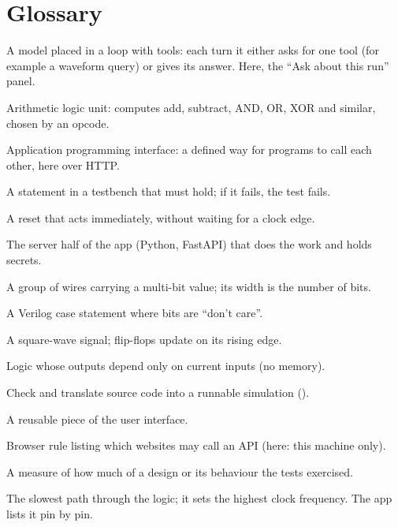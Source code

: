 
\chapter{Glossary}
\label{app:glossary}

\begin{description}[style=nextline,itemsep=1pt]
  \item[Agent (debugging)] A model placed in a loop with tools: each turn it either asks for one tool (for example a waveform query) or gives its answer. Here, the ``Ask about this run'' panel.
  \item[ALU] Arithmetic logic unit: computes add, subtract, AND, OR, XOR and similar, chosen by an opcode.
  \item[API] Application programming interface: a defined way for programs to call each other, here over HTTP.
  \item[Assertion] A statement in a testbench that must hold; if it fails, the test fails.
  \item[Asynchronous reset] A reset that acts immediately, without waiting for a clock edge.
  \item[Backend] The server half of the app (Python, FastAPI) that does the work and holds secrets.
  \item[Bus] A group of wires carrying a multi-bit value; its width is the number of bits.
  \item[casez] A Verilog case statement where  bits are ``don't care''.
  \item[Clock] A square-wave signal; flip-flops update on its rising edge.
  \item[Combinational logic] Logic whose outputs depend only on current inputs (no memory).
  \item[Compile (Verilog)] Check and translate source code into a runnable simulation ().
  \item[Component (React)] A reusable piece of the user interface.
  \item[CORS] Browser rule listing which websites may call an API (here: this machine only).
  \item[Coverage] A measure of how much of a design or its behaviour the tests exercised.
  \item[Critical path] The slowest path through the logic; it sets the highest clock frequency. The app lists it pin by pin.

\end{description}
